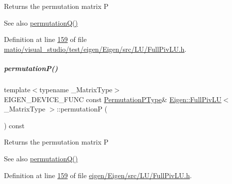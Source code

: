 \begin{DoxyReturn}{Returns}
the permutation matrix P
\end{DoxyReturn}
\begin{DoxySeeAlso}{See also}
\hyperlink{group___l_u___module_a8d18190c7618de271cba7293f0493a36}{permutation\+Q()} 
\end{DoxySeeAlso}


Definition at line \hyperlink{matio_2visual__studio_2test_2eigen_2_eigen_2src_2_l_u_2_full_piv_l_u_8h_source_l00159}{159} of file \hyperlink{matio_2visual__studio_2test_2eigen_2_eigen_2src_2_l_u_2_full_piv_l_u_8h_source}{matio/visual\+\_\+studio/test/eigen/\+Eigen/src/\+L\+U/\+Full\+Piv\+L\+U.\+h}.

\mbox{\label{group___l_u___module_a09274c82240f6441af5e6c99e24e756d}} 
\subparagraph{\texorpdfstring{permutation\+P()}{permutationP()}\hspace{0.1cm}{\footnotesize\ttfamily [2/2]}}
{\footnotesize\ttfamily template$<$typename \+\_\+\+Matrix\+Type$>$ \\
E\+I\+G\+E\+N\+\_\+\+D\+E\+V\+I\+C\+E\+\_\+\+F\+U\+NC const \hyperlink{group___core___module}{Permutation\+P\+Type}\& \hyperlink{group___l_u___module_class_eigen_1_1_full_piv_l_u}{Eigen\+::\+Full\+Piv\+LU}$<$ \+\_\+\+Matrix\+Type $>$\+::permutationP (\begin{DoxyParamCaption}{ }\end{DoxyParamCaption}) const\hspace{0.3cm}{\ttfamily [inline]}}

\begin{DoxyReturn}{Returns}
the permutation matrix P
\end{DoxyReturn}
\begin{DoxySeeAlso}{See also}
\hyperlink{group___l_u___module_a8d18190c7618de271cba7293f0493a36}{permutation\+Q()} 
\end{DoxySeeAlso}


Definition at line \hyperlink{eigen_2_eigen_2src_2_l_u_2_full_piv_l_u_8h_source_l00159}{159} of file \hyperlink{eigen_2_eigen_2src_2_l_u_2_full_piv_l_u_8h_source}{eigen/\+Eigen/src/\+L\+U/\+Full\+Piv\+L\+U.\+h}.

